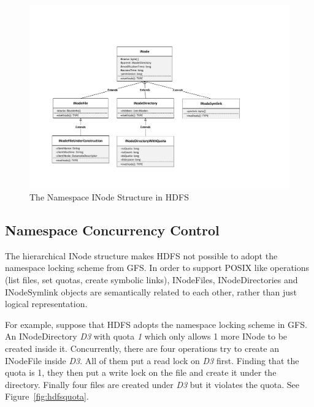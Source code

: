 \begin{figure}[h]
	\centering
	\includegraphics[width=\linewidth]{figs/INodeUML.pdf}
	\caption{The Namespace INode Structure in HDFS}
	\label{fig:inodeuml}
\end{figure}

\subsection{Namespace Concurrency Control}

\noindent The hierarchical INode structure makes HDFS not possible to adopt the namespace locking scheme from GFS. In order to support POSIX like operations (list files, set quotas, create symbolic links), INodeFiles, INodeDirectories and INodeSymlink objects are semantically related to each other, rather than just logical representation.

\noindent For example, suppose that HDFS adopts the namespace locking scheme in GFS. An INodeDirectory \textit{D3} with quota \textit{1} which only allows 1 more INode to be created inside it. Concurrently, there are four operations try to create an INodeFile inside \textit{D3}. All of them put a read lock on \textit{D3} first. Finding that the quota is 1, they then put a write lock on the file and create it under the directory. Finally four files are created under \textit{D3} but it violates the quota. See Figure~\ref{fig:hdfsquota}.

